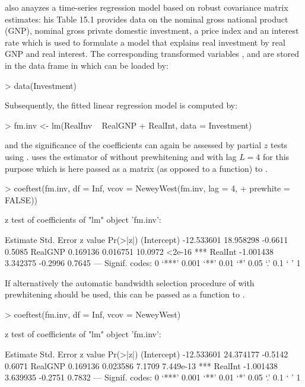 \documentclass{Z}
\begin{document}
\cite{hac:Greene:1993} also anayzes a time-series regression model
based on robust covariance matrix estimates: his Table 15.1 provides
data on the nominal gross national product (GNP), nominal gross private
domestic investment, a price index and an interest rate which is used
to formulate a model that explains real investment by real GNP and real
interest. The corresponding transformed variables , 
and  are stored in the data frame  in
 which can be loaded by:
\begin{Schunk}
\begin{Sinput}
> data(Investment)
\end{Sinput}
\end{Schunk}
Subsequently, the fitted linear regression model is computed by:
\begin{Schunk}
\begin{Sinput}
> fm.inv <- lm(RealInv ~ RealGNP + RealInt, data = Investment)
\end{Sinput}
\end{Schunk}
and the significance of the coefficients can again be assessed
by partial $z$ tests using . \cite{hac:Greene:1993}
uses the estimator of \cite{hac:Newey+West:1987} without prewhitening and
with lag $L = 4$ for this purpose which is here passed as a matrix (as opposed to a function)
to .
\begin{Schunk}
\begin{Sinput}
> coeftest(fm.inv, df = Inf, vcov = NeweyWest(fm.inv, lag = 4, 
+     prewhite = FALSE))
\end{Sinput}
\begin{Soutput}
z test of coefficients of "lm" object 'fm.inv':

              Estimate Std. Error z value Pr(>|z|)    
(Intercept) -12.533601  18.958298 -0.6611   0.5085    
RealGNP       0.169136   0.016751 10.0972   <2e-16 ***
RealInt      -1.001438   3.342375 -0.2996   0.7645    
---
Signif. codes:  0 `***' 0.001 `**' 0.01 `*' 0.05 `.' 0.1 ` ' 1 
\end{Soutput}
\end{Schunk}
If alternatively the automatic bandwidth selection procedure of \cite{hac:Newey+West:1994}
with prewhitening should be used, this can be passed as a function to .
\begin{Schunk}
\begin{Sinput}
> coeftest(fm.inv, df = Inf, vcov = NeweyWest)
\end{Sinput}
\begin{Soutput}
z test of coefficients of "lm" object 'fm.inv':

              Estimate Std. Error z value  Pr(>|z|)    
(Intercept) -12.533601  24.374177 -0.5142    0.6071    
RealGNP       0.169136   0.023586  7.1709 7.449e-13 ***
RealInt      -1.001438   3.639935 -0.2751    0.7832    
---
Signif. codes:  0 `***' 0.001 `**' 0.01 `*' 0.05 `.' 0.1 ` ' 1 
\end{Soutput}
\end{Schunk}
\end{document}
